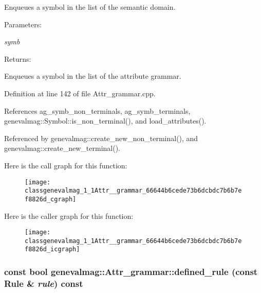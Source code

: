 Enqueues a symbol in the list of the semantic domain. \begin{Desc}
\item[Parameters:]
\begin{description}
\item[{\em symb}]\end{description}
\end{Desc}
\begin{Desc}
\item[Returns:]\end{Desc}
Enqueues a symbol in the list of the attribute grammar. 

Definition at line 142 of file Attr\_\-grammar.cpp.

References ag\_\-symb\_\-non\_\-terminals, ag\_\-symb\_\-terminals, genevalmag::Symbol::is\_\-non\_\-terminal(), and load\_\-attributes().

Referenced by genevalmag::create\_\-new\_\-non\_\-terminal(), and genevalmag::create\_\-new\_\-terminal().

Here is the call graph for this function:\nopagebreak
\begin{figure}[H]
\begin{center}
\leavevmode
\texttt{[image: classgenevalmag\_1\_1Attr\_\_grammar\_66644b6cede73b6dcbdc7b6b7ef8826d\_cgraph]}
\end{center}
\end{figure}


Here is the caller graph for this function:\nopagebreak
\begin{figure}[H]
\begin{center}
\leavevmode
\texttt{[image: classgenevalmag\_1\_1Attr\_\_grammar\_66644b6cede73b6dcbdc7b6b7ef8826d\_icgraph]}
\end{center}
\end{figure}
\hypertarget{classgenevalmag_1_1Attr__grammar_3d7a28dbbd12cbfc7a0bb41a7f8b8ab7}{
\subsubsection[{defined\_\-rule}]{\setlength{\rightskip}{0pt plus 5cm}const bool genevalmag::Attr\_\-grammar::defined\_\-rule (const {\bf Rule} \& {\em rule}) const}}
\label{classgenevalmag_1_1Attr__grammar_3d7a28dbbd12cbfc7a0bb41a7f8b8ab7}


